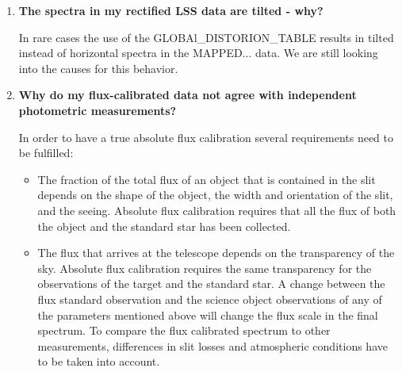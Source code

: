 \begin{enumerate}
\begin{itemize}
An offset 10.5 Å for GRIS\_1200B for instance corresponds to 15 steps [0.7Å/px] in wavelength and thus for binning 2×2 and standard collimator to an offset of 15px $\times$ 0.25"/px, i.e 3.8", on sky.

Depending on the angle on sky with which you data were taken this offset along the dispersion axis will affect right ascension and/or declination.

\item (c) An incorrect wavelength calibration. Errors in the wavelength calibration should be below 1 pixel and thus usually not be noticeable in the derived coordinates. For multi-object spectroscopic data, however, such errors might introduce small shifts between spectra from different slits, which may again affect right ascension and/or declination, depending on the angle on sky of the observations.

\end{itemize}

\item {\bf The spectra in my rectified LSS data are tilted - why?}

In rare cases the use of the GLOBAl\_DISTORION\_TABLE results in tilted instead of horizontal spectra in the MAPPED... data. We are still looking into the causes for this behavior.

\item {\bf Why do my flux-calibrated data not agree with independent photometric measurements?}

In order to have a true absolute flux calibration several requirements need to be fulfilled:

\begin{itemize}
\item The fraction of the total flux of an object that is contained in the slit depends on the shape of the object, the width and orientation of the slit, and the seeing. Absolute flux calibration requires that all the flux of both the object and the standard star has been collected.

\item The flux that arrives at the telescope depends on the transparency of the sky. Absolute flux calibration requires the same transparency for the observations of the target and the standard star. A change between the flux standard observation and the science object observations of any of the parameters mentioned above will change the flux scale in the final spectrum. To compare the flux calibrated spectrum to other measurements, differences in slit losses and atmospheric conditions have to be taken into account.


\end{itemize}
\end{enumerate}
